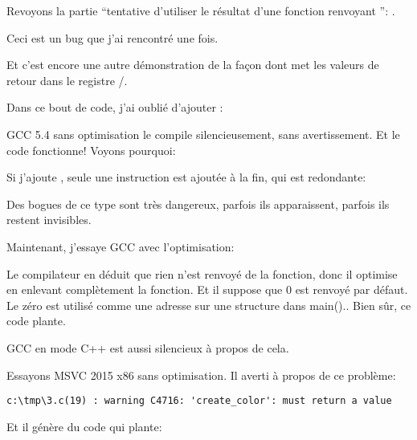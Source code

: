 \label{ForgottenReturn}

Revoyons la partie ``tentative d'utiliser le résultat d'une fonction renvoyant \Tvoid'': .

Ceci est un bug que j'ai rencontré une fois.

Et c'est encore une autre démonstration de la façon dont \CCpp{} met les valeurs de
retour dans le registre \EAX/\RAX.

Dans ce bout de code, j'ai oublié d'ajouter :



GCC 5.4 sans optimisation le compile silencieusement, sans avertissement.
Et le code fonctionne!
Voyons pourquoi:



Si j'ajoute , seule une instruction est ajoutée à la fin, qui est redondante:



Des bogues de ce type sont très dangereux, parfois ils apparaissent, parfois ils
restent invisibles.

Maintenant, j'essaye GCC avec l'optimisation:



Le compilateur en déduit que rien n'est renvoyé de la fonction, donc il optimise
en enlevant complètement la fonction.
Et il suppose que 0 est renvoyé par défaut. Le zéro est utilisé comme une adresse
sur une structure dans main()..
Bien sûr, ce code plante.

GCC en mode C++ est aussi silencieux à propos de cela.

Essayons MSVC 2015 x86 sans optimisation.
Il averti à propos de ce problème:

\begin{lstlisting}
c:\tmp\3.c(19) : warning C4716: 'create_color': must return a value
\end{lstlisting}

Et il génère du code qui plante:



